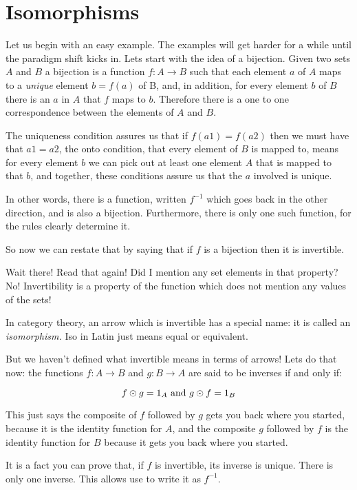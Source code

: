 \documentclass[oneside]{book}
\theoremstyle{plain}
\theoremstyle{definition}
\theoremstyle{plain}
\begin{document}
\section{Isomorphisms}
Let us begin with an easy example. The examples will get harder
for a while until the paradigm shift kicks in. Lets start with
the idea of a bijection. Given two sets $A$ and $B$ a bijection
is a function $f:A\rightarrow B$ such that each element $a$ of $A$ maps
to a {\em unique} element $b=f(a)$ of B, and, in addition,
for every element $b$ of $B$ there is an $a$ in $A$ that
$f$ maps to $b$. Therefore there is a one to one correspondence
between the elements of $A$ and $B$.


The uniqueness condition assures us that if $f(a1) = f(a2)$ then
we must have that $a1=a2$, the onto condition, that every element
of $B$ is mapped to, means for every element $b$ we can pick out at
least one element $A$ that is mapped to that $b$, and together,
these conditions assure us that the $a$ involved is unique.

In other words, there is a function, written $f^{-1}$ which goes
back in the other direction, and is also a bijection. Furthermore,
there is only one such function, for the rules clearly determine it.

So now we can restate that by saying that if $f$ is a bijection
then it is invertible.

Wait there! Read that again!  Did I mention any set elements
in that property? No! Invertibility is a property of the function
which does not mention any values of the sets!

In category theory, an arrow which is invertible has a special name:
it is called an {\em isomorphism.}  Iso in Latin just means equal
or equivalent. 

But we haven't defined what invertible means in terms of arrows!
Lets do that now: the functions $f:A\rightarrow B$ and $g:B\rightarrow A$ are said to
be inverses if and only if:

$$f \odot g = 1_A {\ \rm and\ } g \odot f = 1_B$$

This just says the composite of $f$ followed by $g$ gets you back
where you started, because it is the identity function for $A$,
and the composite $g$ followed by $f$ is the identity function
for $B$ because it gets you back where you started.

It is a fact you can prove that, if $f$ is invertible, its inverse
is unique. There is only one inverse. This allows use to write
it as $f^{-1}$.
\end{document}

